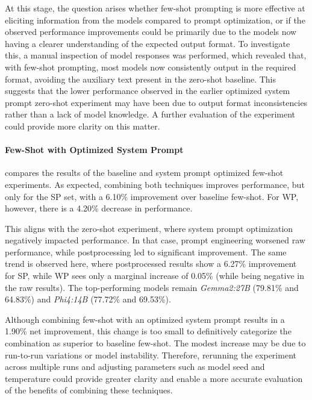 At this stage, the question arises whether few-shot prompting is more effective at eliciting information from the models compared to prompt optimization, or if the observed performance improvements could be primarily due to the models now having a clearer understanding of the expected output format. To investigate this, a manual inspection of model responses was performed, which revealed that, with few-shot prompting, most models now consistently output in the required format, avoiding the auxiliary text present in the zero-shot baseline. This suggests that the lower performance observed in the earlier optimized system prompt zero-shot experiment may have been due to output format inconsistencies rather than a lack of model knowledge. A further evaluation of the  experiment could provide more clarity on this matter.

\paragraph{Few-Shot with Optimized System Prompt}

 compares the results of the baseline and system prompt optimized few-shot experiments. As expected, combining both techniques improves performance, but only for the \ac{SP} set, with a 6.10\% improvement over baseline few-shot. For \ac{WP}, however, there is a 4.20\% decrease in performance.

This aligns with the zero-shot experiment, where system prompt optimization negatively impacted performance. In that case, prompt engineering worsened raw performance, while postprocessing led to significant improvement. The same trend is observed here, where postprocessed results show a 6.27\% improvement for \ac{SP}, while \ac{WP} sees only a marginal increase of 0.05\% (while being negative in the raw results). The top-performing models remain \textit{Gemma2:27B} (79.81\% and 64.83\%) and \textit{Phi4:14B} (77.72\% and 69.53\%).

Although combining few-shot with an optimized system prompt results in a 1.90\% net improvement, this change is too small to definitively categorize the combination as superior to baseline few-shot. The modest increase may be due to run-to-run variations or model instability. Therefore, rerunning the experiment across multiple runs and adjusting parameters such as model seed and temperature could provide greater clarity and enable a more accurate evaluation of the benefits of combining these techniques.


